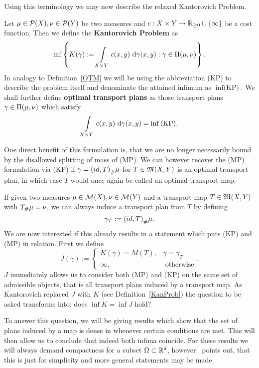 Using this terminology we may now describe the relaxed Kantorovich Problem.

\begin{definition}\label{KanProb}
	Let $\mu \in \PM{X}, \nu \in \PM{Y}$ be two measures and $\map[c]{X \times Y}{\RZero \cup \{\infty\}}$ be a cost function. Then we define the \textbf{Kantorovich Problem} as
	\begin{equation}\label{KP}
		\inf \left\{ K(\gamma) := \int\limits_{X \times Y} c(x, y)~\Dx[x, y]{\gamma} : \gamma \in \TP{\mu}{\nu} \right\}.
	\end{equation}
	In analogy to Definition~\ref{OTM} we will be using the abbreviation (KP) to describe the problem itself and denominate the attained infimum as $\inf \text{(KP)}$. We shall further define \textbf{optimal transport plans} as those transport plans $\gamma \in \TP{\mu}{\nu}$ which satisfy
	\[ \int\limits_{X \times Y} c(x, y)~\Dx[x, y]{\gamma} = \inf \text{(KP)}. \]
\end{definition}

One direct benefit of this formulation is, that we are no longer necessarily bound by the disallowed splitting of mass of (MP). We can however recover the (MP) formulation via (KP) if $\gamma = \push[(id, T)]{\mu}$ for $T \in \MF{X}{Y}$ is an optimal transport plan, in which case $T$ would once again be called an optimal transport map.

If given two measures $\mu \in \M{X}, \nu \in \M{Y}$ and a transport map $T \in \MF{X}{Y}$ with $\push{\mu} = \nu$, we can always induce a transport plan from $T$ by defining
\begin{equation}\label{IndPlan}
	\gamma_T := \push[(id, T)]{\mu}.
\end{equation}
We are now interested if this already results in a statement which puts (KP) and (MP) in relation. First we define
\[ J(\gamma) := 
	\begin{cases}
		K(\gamma) = M(T), & \gamma = \gamma_T \\
		\infty, & \text{ otherwise}
	\end{cases}. \]
$J$ immediately allows us to consider both (MP) and (KP) on the same set of admissible objects, that is all transport plans induced by a transport map. As Kantorovich replaced $J$ with $K$ (see Definition~\ref{KanProb}) the question to be asked transforms into: does $\inf K = \inf J$ hold?

To answer this question, we will be giving results which show that the set of plans induced by a map is dense in  whenever certain conditions are met. This will then allow us to conclude that indeed both infima coincide. For these results we will always demand compactness for a subset $\Omega \subset \R^d$, however~\cite{San2015} points out, that this is just for simplicity and more general statements may be made.

